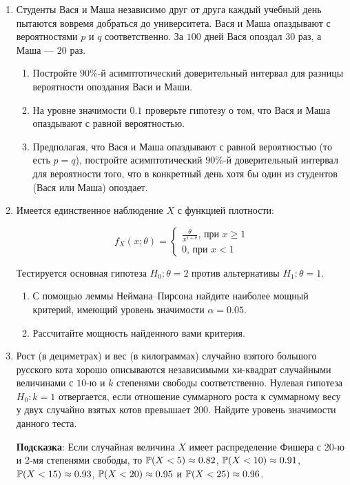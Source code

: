 \begin{enumerate}
\item Студенты Вася и Маша независимо друг от друга каждый учебный день пытаются вовремя добраться до университета. 
Вася и Маша опаздывают с вероятностями $p$ и $q$ соответственно. За $100$ дней Вася опоздал $30$ раз, а Маша — $20$ раз.

\begin{enumerate}
	\item Постройте $90$\%-й асимптотический доверительный интервал для разницы вероятности опоздания Васи и Маши.
	\item На уровне значимости $0.1$ проверьте гипотезу о том, что Вася и Маша опаздывают с равной вероятностью.
	\item Предполагая, что Вася и Маша опаздывают с равной вероятностью (то есть $p=q$), 
	постройте асимптотический $90$\%-й доверительный интервал для вероятности того, 
	что в конкретный день хотя бы один из студентов (Вася или Маша) опоздает.
\end{enumerate}

\newpage
\item Имеется единственное наблюдение $X$ с функцией плотности:

\[
f_{X}(x;\theta)
=\begin{cases}
\frac{\theta}{x^{1+\theta}}\text{, при }x\geq 1\\
0\text{, при } x < 1
\end{cases}
\]

Тестируется основная гипотеза $H_{0}:\theta = 2$ против альтернативы $H_{1}:\theta = 1$. 
\begin{enumerate}
	\item С помощью леммы Неймана–Пирсона найдите наиболее мощный критерий, имеющий уровень значимости $\alpha = 0.05$.
	\item Рассчитайте мощность найденного вами критерия.
\end{enumerate}

\item Рост (в дециметрах) и вес (в килограммах) случайно взятого большого русского кота хорошо описываются независимыми хи-квадрат случайными величинами с $10$-ю и $k$ степенями свободы соответственно. 
Нулевая гипотеза  $H_{0}:k=1$ отвергается, если отношение суммарного роста к суммарному весу у двух случайно взятых котов превышает $200$. 
Найдите уровень значимости данного теста.

\textbf{Подсказка}:  Если случайная величина $X$ имеет распределение Фишера с 20-ю и 2-мя степенями свободы, 
то $\P(X<5)\approx 0.82$, $\P(X<10)\approx 0.91$, $\P(X<15)\approx 0.93$, $\P(X<20)\approx 0.95$ и $\P(X<25)\approx 0.96$.


\end{enumerate}
